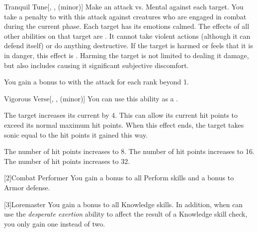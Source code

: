 {            \begin{freeability}{Tranquil Tune}[, ,  (minor)]
                Make an attack vs. Mental against each target.
                You take a  penalty to  with this attack against creatures who are engaged in combat during the current phase.
                \hit Each target has its emotions calmed.
                The effects of all other  abilities on that target are .
                It cannot take violent actions (although it can defend itself) or do anything destructive.
                If the target is harmed or feels that it is in danger, this effect is .
                Harming the target is not limited to dealing it damage, but also includes causing it significant subjective discomfort.

                \rankline
                You gain a  bonus to  with the attack for each rank beyond 1.
            \end{freeability}

            \begin{freeability}{Vigorous Verse}[, ,  (minor)]
                You can use this ability as a .

                The target increases its current  by 4.
                This can allow its current hit points to exceed its normal maximum hit points.
                When this effect ends, the target takes sonic  equal to the hit points it gained this way.

                \rankline
                 The number of hit points increases to 8.
                 The number of hit points increases to 16.
                 The number of hit points increases to 32.
            \end{freeability}
        }

        [2]{Combat Performer} You gain a  bonus to all Perform skills and a  bonus to Armor defense.

        [3]{Loremaster} You gain a  bonus to all Knowledge skills.
        In addition, when can use the \textit{desperate exertion} ability to affect the result of a Knowledge skill check,
            you only gain one  instead of two.

